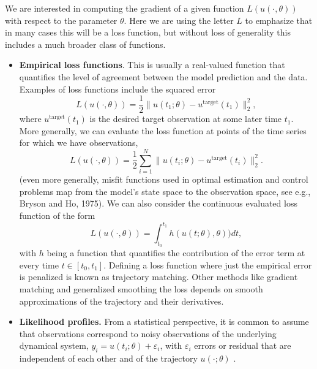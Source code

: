 We are interested in computing the gradient of a given function $L(u(\cdot, \theta))$ with respect to the parameter $\theta$.
Here we are using the letter $L$ to emphasize that in many cases this will be a loss function, but without loss of generality this includes a much broader class of functions. 
\begin{itemize}
    \item \textbf{Empirical loss functions}. This is usually a real-valued function that quantifies the level of agreement between the model prediction and the data. Examples of loss functions include the squared error
    \begin{equation}
         L(u(\cdot, \theta)) = \frac{1}{2} \| u(t_1; \theta) - u^{\text{target}}(t_1) \|_2^2,
         \label{eq:quadratic-loss-function}
    \end{equation}
    where $u^{\text{target}}(t_1)$ is the desired target observation at some later time $t_1$.
    More generally, we can evaluate the loss function at points of the time series for which we have observations, 
    \begin{equation}
        L(u(\cdot, \theta)) = \frac{1}{2} \sum_{i=1}^N \| u(t_i; \theta) - u^{\text{target}}(t_i) \|_2^2.
    \end{equation}
    (even more generally, misfit functions used in optimal estimation and control problems map from the model's state space to the observation space, see e.g., Bryson and Ho, 1975).
    We can also consider the continuous evaluated loss function of the form
    \begin{equation}
         L(u(\cdot, \theta)) = \int_{t_0}^{t_1} h( u(t;\theta), \theta) ) dt, 
    \end{equation}
    with $h$ being a function that quantifies the contribution of the error term at every time $t \in [t_0, t_1]$. 
    Defining a loss function where just the empirical error is penalized is known as trajectory matching. 
    Other methods like gradient matching and generalized smoothing the loss depends on smooth approximations of the trajectory and their derivatives. 
    \item \textbf{Likelihood profiles.} From a statistical perspective, it is common to assume that observations correspond to noisy observations of the underlying dynamical system, 
    $y_i = u(t_i; \theta) + \varepsilon_i$, with $\varepsilon_i$ errors or residual that are independent of each other and of the trajectory $u(\cdot ; \theta)$ \cite{ramsay2017dynamic}.

\end{itemize}
